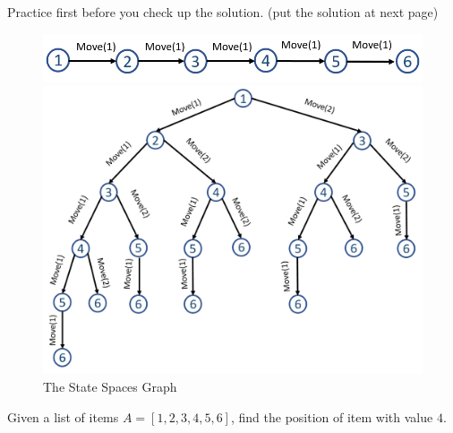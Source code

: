\documentclass[../main.tex]{subfiles}
\begin{document}
\begin{bclogo}[couleur = blue!30, arrondi=0.1,logo=\bccrayon,ombre=true]{Practice first before you check up the solution. (put the solution at next page)}
\end{bclogo}
\begin{figure}[!ht]
    \centering
    \includegraphics[width=0.9\columnwidth]{fig/problem_formulation_1.png}
    
     \includegraphics[width=0.7\columnwidth]{fig/problem_formulation_2.png}
    \caption{The State Spaces Graph }
    \label{fig:problem_formulation}
\end{figure}
 Given a list of items $A=[1, 2, 3, 4, 5, 6]$, find the position of item with value $4$. 
\end{document}
